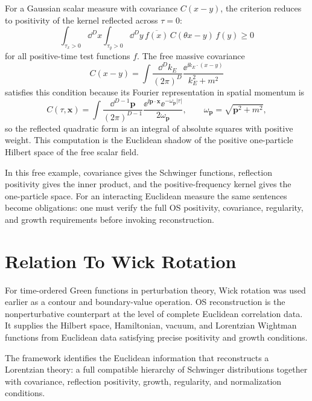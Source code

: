 For a Gaussian scalar measure with covariance \(C(x-y)\), the criterion
reduces to positivity of the kernel reflected across \(\tau=0\):
\[
  \int_{\tau_x>0}\dd^Dx
  \int_{\tau_y>0}\dd^Dy\,
  \overline{f(x)}\,C(\theta x-y)\,f(y)\ge0
\]
for all positive-time test functions \(f\).  The free massive covariance
\[
  C(x-y)=
  \int\frac{\dd^Dk_E}{(2\pi)^D}
  \frac{\ee^{\ii k_E\cdot(x-y)}}{k_E^2+m^2}
\]
satisfies this condition because its Fourier representation in spatial
momentum is
\[
  C(\tau,\mathbf x)
  =
  \int\frac{\dd^{D-1}\mathbf p}{(2\pi)^{D-1}}
  \frac{\ee^{\ii\mathbf p\cdot\mathbf x}
        \ee^{-\omega_{\mathbf p}|\tau|}}
       {2\omega_{\mathbf p}},
  \qquad
  \omega_{\mathbf p}=\sqrt{\mathbf p^2+m^2},
\]
so the reflected quadratic form is an integral of absolute squares with
positive weight.  This computation is the Euclidean shadow of the positive
one-particle Hilbert space of the free scalar field.

In this free example, covariance gives the Schwinger functions, reflection
positivity gives the inner product, and the positive-frequency kernel gives
the one-particle space.  For an interacting Euclidean measure the same
sentences become obligations: one must verify the full OS positivity,
covariance, regularity, and growth requirements before invoking
reconstruction.

\section{Relation To Wick Rotation}

For time-ordered Green functions in perturbation theory, Wick rotation was
used earlier as a contour and boundary-value operation.  OS reconstruction is
the nonperturbative counterpart at the level of complete Euclidean
correlation data.  It supplies the Hilbert space, Hamiltonian, vacuum, and
Lorentzian Wightman functions from Euclidean data satisfying precise
positivity and growth conditions.

The framework identifies the Euclidean information that reconstructs a
Lorentzian theory: a full compatible hierarchy of Schwinger distributions
together with covariance, reflection positivity, growth, regularity, and
normalization conditions.
